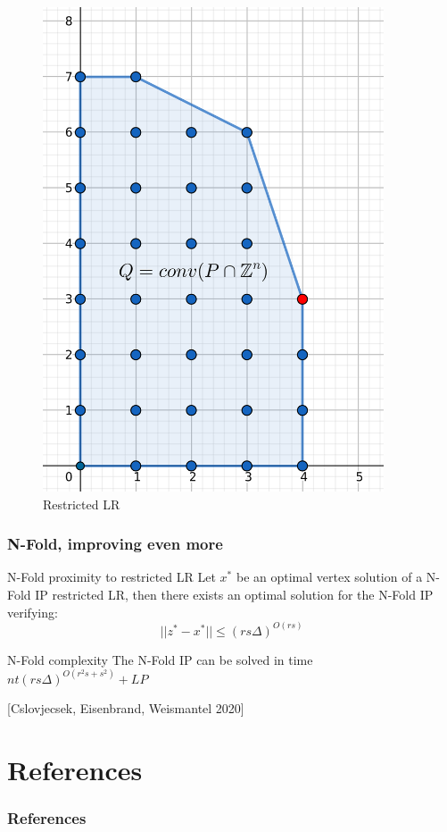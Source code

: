 \documentclass{beamer}
\begin{document}
\begin{frame}
\begin{figure}[!tbp]
\begin{minipage}[b]{0.45\textwidth}
            \includegraphics[width=0.9\textwidth]{images/IP(10).png}
            \caption{Restricted LR}
        \end{minipage}
        \end{figure}
    \end{frame}
    \begin{frame}
        \frametitle{N-Fold, improving even more}
        \vspace{0.5cm}
        \begin{block}{N-Fold proximity to restricted LR}
            Let $x^*$ be an optimal vertex solution of a N-Fold IP restricted LR, then there exists an optimal solution for the N-Fold IP verifying:  
            \begin{equation*}
                ||z^* - x^*|| \leq (rs\Delta)^{O(rs)}
            \end{equation*}
        \end{block}
        \pause
        \vspace{0.5cm}
        \begin{block}{N-Fold complexity}
            The N-Fold IP can be solved in time $nt(rs\Delta)^{O(r^2s + s^2)} + LP$
        \end{block}
        [Cslovjecsek, Eisenbrand, Weismantel 2020]
        
    \end{frame}
    
    
    
    \section{References}
    \begin{frame}[allowframebreaks] %
        \frametitle{References}
        \nocite{*}
        \printbibliography
    \end{frame}
\end{document}
